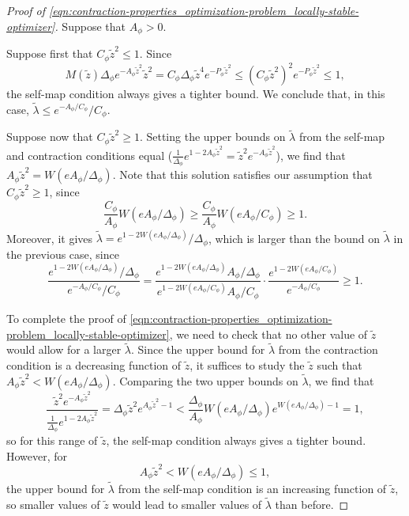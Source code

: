 \documentclass[11pt]{article}
\newcommand{\pwcc}{\Delta_{\phi}}
\newcommand{\tl}{\tilde{\lambda}}
\newcommand{\tz}{\tilde{z}}
\newcommand{\aconst}{A_{\phi}}
\newcommand{\pconst}{P_{\phi}}
\numberwithin{equation}{section}
\theoremstyle{plain}
\theoremstyle{definition}
\theoremstyle{remark}
\begin{document}
\begin{proof}[Proof of \eqref{eqn:contraction-properties_optimization-problem_locally-stable-optimizer}]
Suppose that $\aconst>0$.

Suppose first that $C_{\phi}\tz^{2}\le 1$.
Since 
\begin{equation}
M(\tz)\pwcc e^{-\aconst\tz^{2}}\tz^{2}
=C_{\phi}\pwcc\tz^{4}e^{-\pconst\tz^{2}}
\le(C_{\phi}\tz^{2})^{2}e^{-\pconst\tz^{2}} \le 1,
\end{equation}
the self-map condition always gives a tighter bound.
We conclude that, in this case, $\tl\le e^{-\aconst/C_{\phi}}/C_{\phi}$.

Suppose now that $C_{\phi}\tz^{2}\ge 1$.
Setting the upper bounds on $\tl$ from the self-map and contraction conditions equal ($\frac{1}{\pwcc}e^{1-2\aconst\tz^{2}}=\tz^{2}e^{-\aconst\tz^{2}}$), we find that $\aconst\tz^{2}=W(e\aconst/\pwcc)$.
Note that this solution satisfies our assumption that $C_{\phi}\tz^{2}\ge 1$, since
\begin{equation}
\frac{C_{\phi}}{\aconst}W(eA_{\phi}/\pwcc)\ge \frac{C_{\phi}}{\aconst}W(eA_{\phi}/C_{\phi})\ge 1.
\end{equation}
Moreover, it gives $\tl=e^{1-2W(e\aconst/\pwcc)}/\pwcc$, which is larger than the bound on $\tl$ in the previous case, since
\begin{equation}
\label{eqn:contraction-properties_real-contraction_optimization-problem_assumption-used-1}
\frac{e^{1-2W(e\aconst/\pwcc)}/\pwcc}{e^{-\aconst/C_{\phi}}/C_{\phi}}
=\frac{e^{1-2W(e\aconst/\pwcc)}\aconst/\pwcc}{e^{1-2W(e\aconst/C_{\phi})}\aconst/C_{\phi}}
\cdot \frac{e^{1-2W(e\aconst/C_{\phi})}}{e^{-\aconst/C_{\phi}}}
\ge 1.
\end{equation}

To complete the proof of \eqref{eqn:contraction-properties_optimization-problem_locally-stable-optimizer}, we need to check that no other value of $\tz$ would allow for a larger $\tl$.
Since the upper bound for $\tl$ from the contraction condition is a decreasing function of $\tz$, it suffices to study the $\tz$ such that $\aconst\tz^{2}<W(e\aconst/\pwcc)$.
Comparing the two upper bounds on $\tl$, we find that
\begin{equation}
\frac{\tz^{2}e^{-\aconst\tz^{2}}}{\frac{1}{\pwcc}e^{1-2\aconst\tz^{2}}}
=\pwcc\tz^{2}e^{\aconst\tz^{2}-1}
<\frac{\pwcc}{\aconst}W(e\aconst/\pwcc)e^{W(e\aconst/\pwcc)-1}=1,
\end{equation}
so for this range of $\tz$, the self-map condition always gives a tighter bound.
However, for 
\begin{equation}
\label{eqn:contraction-properties_real-contraction_optimization-problem_assumption-used-2}
\aconst\tz^{2}<W(e\aconst/\pwcc)\le1,
\end{equation}
the upper bound for $\tl$ from the self-map condition is an increasing function of $\tz$, so smaller values of $\tz$ would lead to smaller values of $\tl$ than before.
\end{proof}
\end{document}
